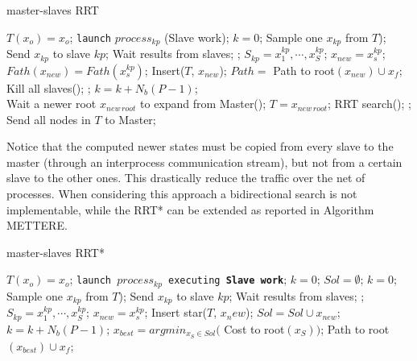 \begin{algorithm}
\caption{master-slaves RRT}\label{alg:RRT_master_slave}
\begin{algorithmic}[1]
\State $T(x_o)={x_o}$; 
\State \texttt{launch} $process_{kp}$ (Slave work);
\EndFor
\State $k=0$;
	\State Sample one $x_{kp}$ from $T$);
	\State Send $x_{kp}$ to slave $kp$;
	\EndFor
	\State Wait results from slaves;
	\State {};
	\State $S_{kp} = {x^{kp}_{1}, \cdots ,x^{kp}_{S}}$; 
		\State $x_{new} = x^{kp}_{s}$;
		\State $Fath(x_{new}) = Fath(x^{kp}_{s})$;
		\State Insert($T$, $x_{new}$);
		\State $Path=$ Path to root$(x_{new}) \cup x_f$;
		\State Kill all slaves();
		\State \Return;
		\EndIf
	\EndFor
	\EndFor
	\State $k=k+N_b(P-1)$;
\EndWhile
\EndProcedure
\\
\State Wait a newer root $x_{new\,root}$ to expand from Master();
\State $T=x_{new\,root}$;
\State RRT search(); ;
\State Send all nodes in $T$ to Master;
\EndWhile
\EndProcedure
\end{algorithmic}
\end{algorithm}

Notice that the computed newer states must be copied from every slave to the master (through an interprocess communication stream), but not from a certain slave to the other ones. This drastically reduce the traffic over the net of processes. 
When considering this approach a bidirectional search is not implementable, while the RRT* can be extended as reported in Algorithm METTERE.

\begin{algorithm}
\caption{master-slaves RRT*}\label{alg:RRT_star_master_slave}
\begin{algorithmic}[1]
\State $T(x_o)={x_o}$; 
\State \texttt{launch $process_{kp}$ executing \textbf{Slave work}};
\EndFor
\State $k=0$;
\State $Sol = \emptyset$;
\State $k=0$;
	\State Sample one $x_{kp}$ from $T$);
	\State Send $x_{kp}$ to slave $kp$;
	\EndFor
	\State Wait results from slaves;
	\State {};
	\State $S_{kp} = {x^{kp}_{1}, \cdots ,x^{kp}_{S}}$; 
		\State $x_{new} = x^{kp}_{s}$;
		\State Insert star($T$, $x_new$);
		\State $Sol = Sol \cup x_{new}$;
		\EndIf
	\EndFor
	\EndFor
	\State $k=k+N_b(P-1)$;
\EndWhile
\State $x_{best} = argmin_{x_S \in Sol} ($ Cost to root$(x_S) ) $;
\State \Return Path to root$(x_{best}) \cup x_f$;
\EndProcedure
\end{algorithmic}
\end{algorithm}

